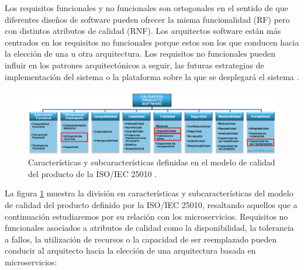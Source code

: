 \documentclass[11pt,spanish,listoffigures]{tfgetsinf}
\begin{document}
Los requisitos funcionales y no funcionales son ortogonales en el sentido de que diferentes diseños de software pueden ofrecer la misma funcionalidad (RF) pero con distintos atributos de calidad (RNF). Los arquitectos software están más centrados en los requisitos no funcionales porque estos son los que conducen hacia la elección de una u otra arquitectura. Los requisitos no funcionales pueden influir en los patrones arquitectónicos a seguir, las futuras estrategias de implementación del sistema o la plataforma sobre la que se desplegará el sistema \cite{Ameller2013}.

\begin{figure}[h]
\centering
\includegraphics[scale=0.5]{iso25010}
\caption{Características y subcaracterísticas definidas en el modelo de calidad del producto de la ISO/IEC 25010 \cite{Standard2010}.}
\label{fig:iso25010}
\end{figure}

La figura \ref{fig:iso25010} muestra la división en características y subcaracterísticas del modelo de calidad del producto definido por la ISO/IEC 25010, resaltando aquellos que a continuación estudiaremos por su relación con los microservicios. Requisitos no funcionales asociados a atributos de calidad como la disponibilidad, la tolerancia a fallos, la utilización de recursos o la capacidad de ser reemplazado pueden conducir al arquitecto hacia la elección de una arquitectura basada en microservicios:
\end{document}
